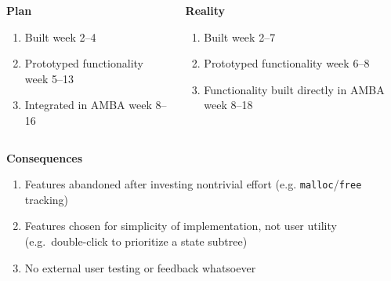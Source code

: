 \begin{frame}
	\begin{columns}[t]
		\begin{column}{0.4\textwidth}
			\textbf{Plan}
			\begin{enumerate}
				\item Built \stoe{} week 2--4
				\item Prototyped functionality week 5--13
				\item Integrated in AMBA week 8--16
			\end{enumerate}
		\end{column}
		\begin{column}{0.4\textwidth}
			\pause{}
			\textbf{Reality}
			\begin{enumerate}
				\item Built \stoe{} week 2--7
				\item Prototyped functionality week 6--8
				\item Functionality built directly in AMBA week 8--18
			\end{enumerate}
		\end{column}
	\end{columns}
	\pause{}
	\textbf{Consequences}
	\begin{enumerate}

		\item Features abandoned after investing nontrivial effort (e.g.
		      \texttt{malloc}/\texttt{free} tracking)

		\item Features chosen for simplicity of implementation, not user utility
		      (e.g.\ double-click to prioritize a state subtree)

		\item No external user testing or feedback whatsoever

	\end{enumerate}
\end{frame}
